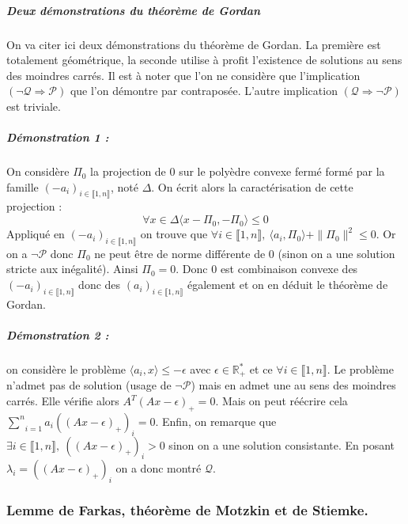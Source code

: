 \documentclass[10pt,a4paper]{article}
\begin{document}
\subparagraph{Deux démonstrations du théorème de Gordan}
On va citer ici deux démonstrations du théorème de Gordan.
La première est totalement géométrique, la seconde utilise à profit l'existence de solutions au sens des moindres carrés.
Il est à noter que l'on ne considère que l'implication $(\neg \mathcal{Q} \Rightarrow \mathcal{P})$ que l'on démontre par contraposée.
L'autre implication $(\mathcal{Q} \Rightarrow \neg \mathcal{P})$ est triviale.
\subparagraph{Démonstration 1 :} On considère $\Pi_0$ la projection de $0$ sur le polyèdre convexe fermé formé par la famille $(-a_i)_{i \in \llbracket 1,n \rrbracket}$, noté $\Delta$.
On écrit alors la caractérisation de cette projection :
\begin{equation}
\forall x \in \Delta \langle x- \Pi_0,-\Pi_0 \rangle \le 0
\end{equation}
Appliqué en $(-a_i)_{i \in \llbracket 1,n \rrbracket}$ on trouve que $\forall i \in \llbracket 1,n \rrbracket, \ \langle a_i, \Pi_0 \rangle + \| \Pi_0 \|^2 \le 0$.
Or on a $\neg \mathcal{P}$ donc $\Pi_0$ ne peut être de norme différente de $0$ (sinon on a une solution stricte aux inégalité).
Ainsi $\Pi_0=0$.
Donc $0$ est combinaison convexe des $(-a_i)_{i \in \llbracket 1,n \rrbracket}$ donc des $(a_i)_{i \in \llbracket 1,n \rrbracket}$ également et on en déduit le théorème de Gordan.
\subparagraph{Démonstration 2 :} on considère le problème $\langle a_i, x \rangle \le -\epsilon$ avec $\epsilon \in \mathbb{R}_+^*$ et ce $\forall i \in \llbracket 1,n \rrbracket$.
Le problème n'admet pas de solution (usage de $\neg \mathcal{P}$) mais en admet une au sens des moindres carrés.
Elle vérifie alors $A^T(Ax-\epsilon)_+=0$.
Mais on peut réécrire cela $\underset{i=1}{\overset{n}{\sum}}a_i ((Ax-\epsilon)_+)_i=0$.
Enfin, on remarque que $\exists i \in \llbracket 1,n \rrbracket, \ ((Ax-\epsilon)_+)_i>0$ sinon on a une solution consistante.
En posant $\lambda_i=((Ax-\epsilon)_+)_i$ on a donc montré $\mathcal{Q}$.

\subsubsection{Lemme de Farkas, théorème de Motzkin et de Stiemke.}
\end{document}
